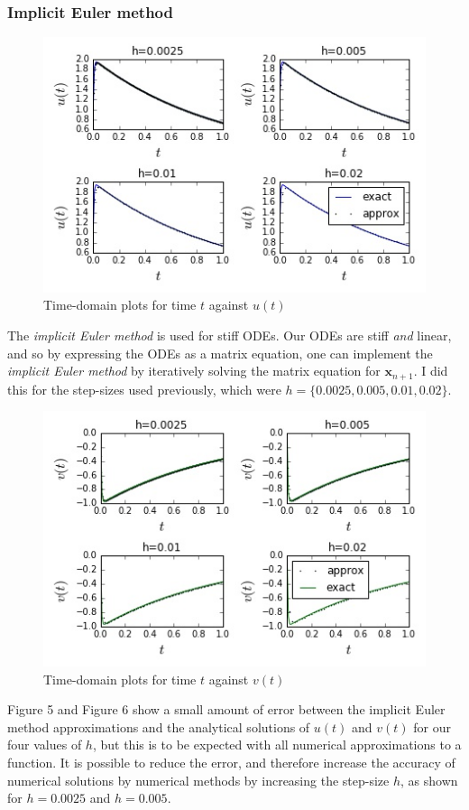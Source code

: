 \documentclass[11pt,a4paper]{article}
\begin{document}
\subsubsection*{Implicit Euler method}
\begin{figure}[h]
\caption{Time-domain plots for time $t$ against $u(t)$}
\includegraphics[scale=0.8]{back_euler_u.jpg}
\centering
\end{figure}
The \textit{implicit Euler method} is used for stiff ODEs. Our ODEs are stiff \textit{and} linear, and so by expressing the ODEs as a matrix equation, one can implement the \textit{implicit Euler method} by iteratively solving the matrix equation for $\boldsymbol{x}_{n+1}$. I did this for the step-sizes used previously, which were $h=\{0.0025,0.005,0.01,0.02\}$.
\begin{figure}[h]
\caption{Time-domain plots for time $t$ against $v(t)$}
\includegraphics[scale=0.8]{back_euler_v.jpg}
\centering
\end{figure}
Figure 5 and Figure 6 show a small amount of error between the implicit Euler method approximations and the analytical solutions of $u(t)$ and $v(t)$ for our four values of $h$, but this is to be expected with all numerical approximations to a function. It is possible to reduce the error, and therefore increase the accuracy of numerical solutions by numerical methods by increasing the step-size $h$, as shown for $h=0.0025$ and $h=0.005$. 
\end{document}
